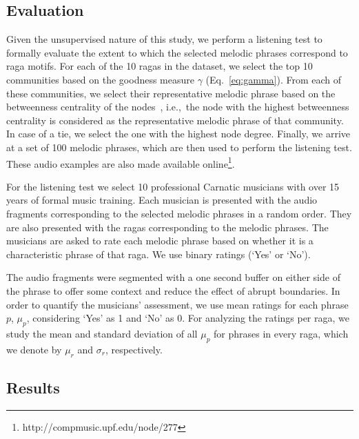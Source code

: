 \subsection{Evaluation}


Given the unsupervised nature of this study, we perform a listening test to formally evaluate the extent to which the selected melodic phrases correspond to \gls{raga} motifs. For each of the 10 \glspl{raga} in the dataset, we select the top 10 communities based on the goodness measure $\gamma$ (Eq.~\ref{eq:gamma}). From each of these communities, we select their representative melodic phrase based on the betweenness centrality of the nodes~\cite{newman2003structure}, i.e.,~the node with the highest betweenness centrality is considered as the representative melodic phrase of that community. In case of a tie, we select the one with the highest node degree. Finally, we  arrive at a set of 100 melodic phrases, which are then used to perform the listening test. These audio examples are also made available online\footnote{http://compmusic.upf.edu/node/277}.

For the listening test we select 10 professional Carnatic musicians with over 15 years of formal music training. Each musician is presented with the audio fragments corresponding to the selected melodic phrases in a random order. They are also presented with the \glspl{raga} corresponding to the melodic phrases. The musicians are asked to rate each melodic phrase based on whether it is a characteristic phrase of that \gls{raga}. We use binary ratings (`Yes' or `No'). 

The audio fragments were segmented with a one second buffer on either side of the phrase to offer some context and reduce the effect of abrupt boundaries. %
In order to quantify the musicians' assessment, we use mean ratings for each phrase $p$, $\mu_p$, considering `Yes' as 1 and `No' as 0. For analyzing the ratings per \gls{raga}, we study the mean and standard deviation of all $\mu_p$ for phrases in every \gls{raga}, which we denote by $\mu_r$ and $\sigma_r$, respectively.


\subsection{Results}


